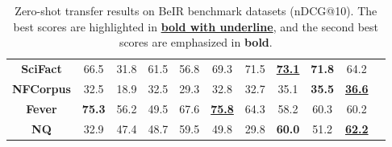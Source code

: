 \begin{table*}[t!]
\begin{adjustbox}{width=1.\textwidth,center}
\begin{tabular}{ccccccccccc}
\textbf{SciFact}       & 66.5  & 31.8  & 61.5       & 56.8     & 69.3       &  71.5 &   \underline{\textbf{73.1}}   &  \textbf{71.8}           &   64.2              \\
\textbf{NFCorpus}      & 32.5  & 18.9  & 32.5       & 29.3     & 32.8       & 32.7   &  35.1 &    \textbf{35.5}             &  \underline{\textbf{36.6}}          \\
\textbf{Fever}         & \textbf{75.3}  & 56.2  & 49.5       & 67.6     & \underline{\textbf{75.8}}       & 64.3   & 58.2 & 60.3           &     60.2            \\
\textbf{NQ}            & 32.9  & 47.4  & 48.7       & 59.5     & 49.8       & 29.8  & \textbf{60.0}   & 51.2          &   \underline{\textbf{62.2}} \\\hline              
\end{tabular}
\end{adjustbox}
\caption{Zero-shot transfer results on  BeIR benchmark datasets (nDCG@10). The best scores are highlighted in \underline{\textbf{bold with underline}}, and the second best scores are emphasized in  \textbf{bold}.}
\label{tab:main_zeroshot}
\end{table*}